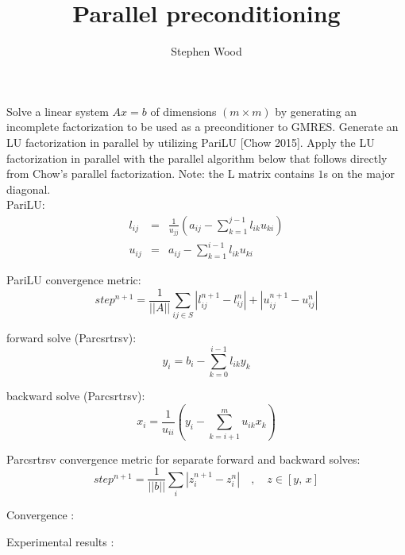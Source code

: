 \documentclass[12pt,preprint]{article}
\begin{document}
\title{Parallel preconditioning}
\author{Stephen Wood}

\maketitle

Solve a linear system $Ax = b$ of dimensions $(m \times m)$ by generating an incomplete factorization 
to be used as a preconditioner to GMRES. 
Generate an LU factorization in parallel by utilizing PariLU [Chow 2015].
Apply the LU factorization in parallel with the parallel algorithm below that follows directly from 
Chow's parallel factorization. 
Note: the L matrix contains $1$s on the major diagonal. \\

 
PariLU:
\begin{eqnarray}
l_{ij} &=& \frac{1}{u_{jj}} \left ( a_{ij}-\sum\limits_{k=1}^{j-1} l_{ik} u_{ki} \right ) \\
u_{ij} &=& a_{ij}-\sum\limits_{k=1}^{i-1} l_{ik} u_{ki} 
\end{eqnarray}

PariLU convergence metric:
\begin{equation}
step^{n+1} = \frac{1}{||A||} \sum\limits_{ij \in S} |l_{ij}^{n+1}-l_{ij}^n| + |u_{ij}^{n+1}-u_{ij}^n|
\end{equation}

forward solve (Parcsrtrsv): 
\begin{equation}
y_i = b_i-\sum\limits_{k=0}^{i-1} l_{ik} y_k
\end{equation}

backward solve (Parcsrtrsv): 
\begin{equation}
x_i = \frac{1}{ u_{ii} } \left ( y_i-\sum\limits_{k=i+1}^{m} u_{ik} x_k \right ) 
\end{equation}

Parcsrtrsv convergence metric for separate forward and backward solves:
\begin{equation}
step^{n+1} = \frac{1}{||b||} \sum\limits_{i} |z_{i}^{n+1}-z_{i}^n|\quad,\quad z\in[y,\,x]
\end{equation}

Convergence :



Experimental results :
\end{document}
